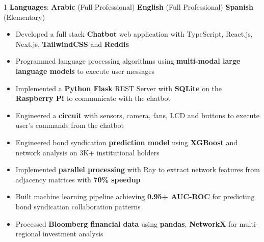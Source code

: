 \documentclass[11pt,a4paper,ragged2e]{altacv}
\begin{document}
\begin{paracol}{1}
\textbf{Languages}:  \textbf{Arabic} (Full Professional) \hfill \textbf{English} (Full Professional) \hfill \textbf{Spanish} (Elementary)


\medskip

\begin{itemize}
  \item Developed a full stack \textbf{Chatbot} web application with TypeScript, React.js, Next.js, \textbf{TailwindCSS} and \textbf{Reddis}
  \item Programmed language processing algorithms using \textbf{multi-modal large language models} to execute user messages
  \item Implemented a \textbf{Python Flask} REST Server with \textbf{SQLite} on the \textbf{Raspberry Pi} to communicate with the chatbot
  \item Engineered a \textbf{circuit} with sensors, camera, fans, LCD and buttons to execute user's commands from the chatbot 
  \end{itemize}

  \medskip


\begin{itemize}
\item Engineered bond syndication \textbf{prediction model} using \textbf{XGBoost} and network analysis on 3K+ institutional holders
\item Implemented \textbf{parallel processing} with Ray to extract network features from adjacency matrices with \textbf{70\% speedup}
\item Built machine learning pipeline achieving \textbf{0.95+ AUC-ROC} for predicting bond syndication collaboration patterns
\item Processed \textbf{Bloomberg financial data} using \textbf{pandas}, \textbf{NetworkX} for multi-regional investment analysis
\end{itemize}
\tightdivider


\end{paracol}
\end{document}
